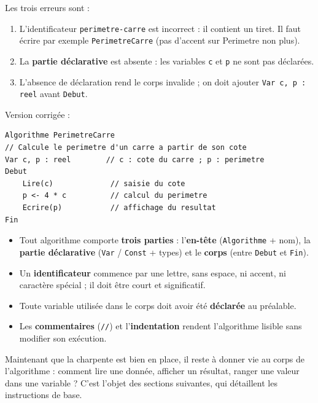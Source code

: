 \documentclass[11pt]{article}
\begin{document}
\begin{corrige}[Exercice 1]
Les trois erreurs sont :
\begin{enumerate}
    \item L'identificateur \texttt{perimetre-carre} est incorrect : il contient un tiret. Il faut écrire par exemple \texttt{PerimetreCarre} (pas d'accent sur Perimetre non plus).
    \item La \textbf{partie déclarative} est absente : les variables \texttt{c} et \texttt{p} ne sont pas déclarées.
    \item L'absence de déclaration rend le corps invalide ; on doit ajouter \texttt{Var c, p : reel} avant \texttt{Debut}.
\end{enumerate}
Version corrigée :
\begin{lstlisting}
Algorithme PerimetreCarre
// Calcule le perimetre d'un carre a partir de son cote
Var c, p : reel        // c : cote du carre ; p : perimetre
Debut
    Lire(c)             // saisie du cote
    p <- 4 * c          // calcul du perimetre
    Ecrire(p)           // affichage du resultat
Fin
\end{lstlisting}
\end{corrige}

\begin{aretenir}
\begin{itemize}
    \item Tout algorithme comporte \textbf{trois parties} : l'\textbf{en-tête} (\texttt{Algorithme} + nom), la \textbf{partie déclarative} (\texttt{Var} / \texttt{Const} + types) et le \textbf{corps} (entre \texttt{Debut} et \texttt{Fin}).
    \item Un \textbf{identificateur} commence par une lettre, sans espace, ni accent, ni caractère spécial ; il doit être court et significatif.
    \item Toute variable utilisée dans le corps doit avoir été \textbf{déclarée} au préalable.
    \item Les \textbf{commentaires} (\texttt{//}) et l'\textbf{indentation} rendent l'algorithme lisible sans modifier son exécution.
\end{itemize}
\end{aretenir}

Maintenant que la charpente est bien en place, il reste à donner vie au corps de l'algorithme : comment lire une donnée, afficher un résultat, ranger une valeur dans une variable ? C'est l'objet des sections suivantes, qui détaillent les instructions de base.
\end{document}

